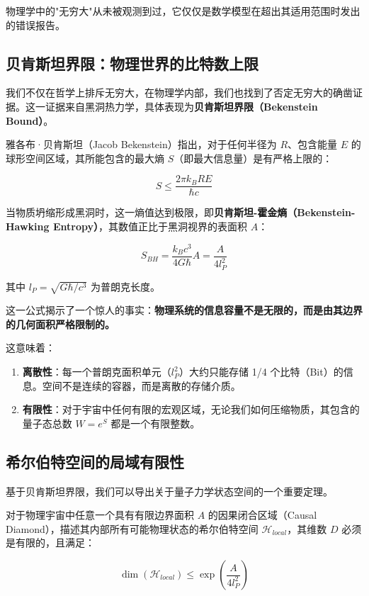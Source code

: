 物理学中的"无穷大"从未被观测到过，它仅仅是数学模型在超出其适用范围时发出的错误报告。

\subsection{贝肯斯坦界限：物理世界的比特数上限}

我们不仅在哲学上排斥无穷大，在物理学内部，我们也找到了否定无穷大的确凿证据。这一证据来自黑洞热力学，具体表现为\textbf{贝肯斯坦界限（Bekenstein Bound）}。

雅各布·贝肯斯坦（Jacob Bekenstein）指出，对于任何半径为 $R$、包含能量 $E$ 的球形空间区域，其所能包含的最大熵 $S$（即最大信息量）是有严格上限的：

\begin{equation}
S \le \frac{2\pi k_B R E}{\hbar c}
\end{equation}

当物质坍缩形成黑洞时，这一熵值达到极限，即\textbf{贝肯斯坦-霍金熵（Bekenstein-Hawking Entropy）}，其数值正比于黑洞视界的表面积 $A$：

\begin{equation}
S_{BH} = \frac{k_B c^3}{4G\hbar} A = \frac{A}{4 l_P^2}
\end{equation}

其中 $l_P = \sqrt{G\hbar/c^3}$ 为普朗克长度。

这一公式揭示了一个惊人的事实：\textbf{物理系统的信息容量不是无限的，而是由其边界的几何面积严格限制的。}

这意味着：

\begin{enumerate}
\item \textbf{离散性}：每一个普朗克面积单元（$l_P^2$）大约只能存储 1/4 个比特（Bit）的信息。空间不是连续的容器，而是离散的存储介质。

\item \textbf{有限性}：对于宇宙中任何有限的宏观区域，无论我们如何压缩物质，其包含的量子态总数 $W = e^S$ 都是一个有限整数。
\end{enumerate}

\subsection{希尔伯特空间的局域有限性}

基于贝肯斯坦界限，我们可以导出关于量子力学状态空间的一个重要定理。

\begin{theorem}[希尔伯特空间维数有限定理]
对于物理宇宙中任意一个具有有限边界面积 $A$ 的因果闭合区域（Causal Diamond），描述其内部所有可能物理状态的希尔伯特空间 $\mathcal{H}_{local}$，其维数 $D$ 必须是有限的，且满足：

\begin{equation}
\dim(\mathcal{H}_{local}) \le \exp\left(\frac{A}{4 l_P^2}\right)
\end{equation}
\end{theorem}

